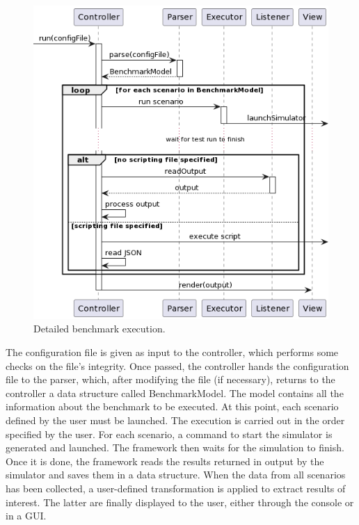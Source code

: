 \documentclass[12pt,a4paper,openright,twoside]{book}
\begin{document}
\begin{figure}[h!]
  \centering
  \includegraphics[width=\textwidth]{figures/execution-sequence.png}
  \caption{Detailed benchmark execution.}
  \label{fig:benchmark-sequence-diagram}
\end{figure}

The configuration file is given as input to the controller, which performs some checks on the file's integrity.
Once passed, the controller hands the configuration file to the parser, which, after modifying the file (if necessary), returns to the controller a data structure called BenchmarkModel.
The model contains all the information about the benchmark to be executed.
At this point, each scenario defined by the user must be launched.
The execution is carried out in the order specified by the user.
For each scenario, a command to start the simulator is generated and launched.
The framework then waits for the simulation to finish.
Once it is done, the framework reads the results returned in output by the simulator and saves them in a data structure.
When the data from all scenarios has been collected, a user-defined transformation is applied to extract results of interest.
The latter are finally displayed to the user, either through the console or in a GUI.
\end{document}
